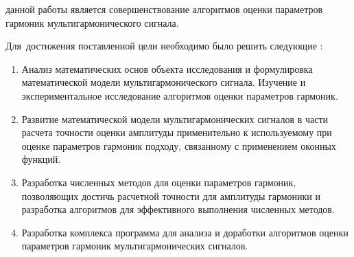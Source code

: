 %
%
%
%
%
%
{\aim} данной работы является совершенствование алгоритмов оценки параметров гармоник мультигармонического сигнала.



Для~достижения поставленной цели необходимо было решить следующие {\tasks}:
\begin{enumerate}
  \item Анализ математических основ объекта исследования и формулировка математической модели мультигармонического сигнала. Изучение и экспериментальное исследование алгоритмов оценки параметров гармоник.
  
  \item Развитие математической модели мультигармонических сигналов в части расчета точности оценки амплитуды применительно к используемому при оценке параметров гармоник подходу, связанному с применением оконных функций.
  
  \item Разработка численных методов для оценки параметров гармоник, позволяющих достичь расчетной точности для амплитуды гармоники и разработка алгоритмов для эффективного выполнения численных методов.
  
  \item Разработка комплекса программа для анализа и доработки алгоритмов оценки параметров гармоник мультигармонических сигналов.
\end{enumerate}



